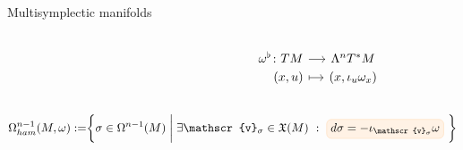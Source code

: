 \documentclass[handout,10pt]{beamer}
\begin{document}
\begin{frame}[fragile]{Multisymplectic manifolds} %
	\begin{defblock}
		
	\end{defblock}
	\begin{defblock}
		\begin{columns}
			\begin{column}{.45\linewidth}
			\end{column}
			\begin{column}{.5\linewidth}
						\vspace{-.5em}
				\[
				\begin{tikzcd}[column sep= small,row sep=0ex,
				/tikz/column 1/.append style={anchor=base east}]
				    \omega^\flat \colon T M \ar[r]& \Lambda^n T^\ast M \\
  						 (x,u) \ar[r, mapsto]& (x,\iota_{u} \omega_x)						
				\end{tikzcd}	
				\]
			\end{column}
		\end{columns}
	\end{defblock}
	\pause
	\begin{defblock}
		\begin{displaymath}
			\Omega^{n-1}_{ham}(M,\omega) 	:=
			\biggr\{ \sigma \in  \Omega^{n-1}(M) \; \biggr\vert \; 
				\exists \mathscr{v}_\sigma \in \mathfrak{X}(M) ~:~ 
				\tikz[baseline,remember picture]{\node[rounded corners,
                        fill=orange!10,draw=orange!30,anchor=base]            
            			(target) {$d \sigma = -\iota_{\mathscr{v}_\sigma} \omega$ };
            	}				
				~\biggr\} 
			\end{displaymath}
	\end{defblock}
	\pause
\end{frame}
\end{document}
